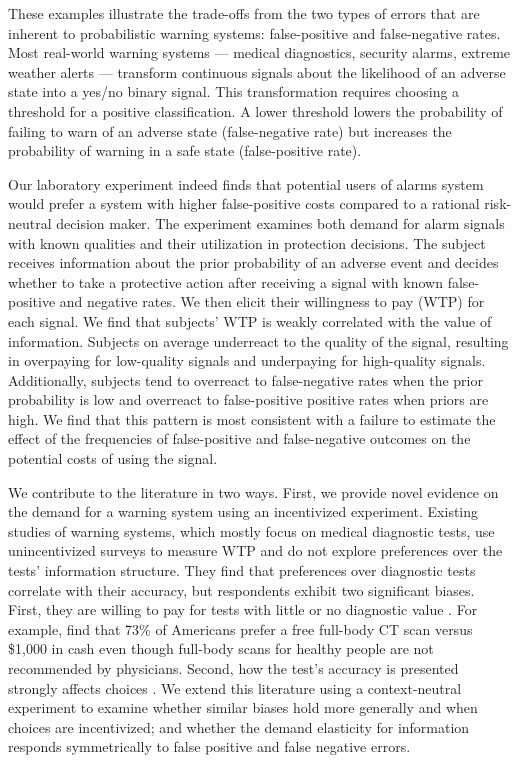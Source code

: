 \documentclass[12pt,a4paper]{article}
\begin{document}
These examples illustrate the trade-offs from the two types of errors that are inherent to probabilistic warning systems: false-positive and false-negative rates.  Most real-world warning systems --- medical diagnostics, security alarms, extreme weather alerts --- transform continuous signals about the likelihood of an adverse state into a yes/no binary signal. This transformation requires choosing a threshold for a positive classification. A lower threshold lowers the probability of failing to warn of an adverse state (false-negative rate) but increases the probability of warning in a safe state (false-positive rate). 

Our laboratory experiment indeed finds that potential users of alarms system would prefer a system with higher false-positive costs compared to a rational risk-neutral decision maker. The experiment examines both demand for alarm signals with known qualities and their utilization in protection decisions. The subject receives information about the prior probability of an adverse event and decides whether to take a protective action after receiving a signal with known false-positive and negative rates. We then elicit their willingness to pay (WTP) for each signal. We find that subjects' WTP is weakly correlated with the value of information. Subjects on average underreact to the quality of the signal, resulting in overpaying for low-quality signals and underpaying for high-quality signals. Additionally, subjects tend to overreact to false-negative rates when the prior probability is low and overreact to false-positive positive rates when priors are high. We find that this pattern is most consistent with a failure to estimate the effect of the frequencies of false-positive and false-negative outcomes on the potential costs of using the signal. 

We contribute to the literature in two ways. First, we provide novel evidence on the demand for a warning system using an incentivized experiment. Existing studies of warning systems, which mostly focus on medical diagnostic tests, use unincentivized surveys to measure WTP and do not explore preferences over the tests' information structure. They find that preferences over diagnostic tests correlate with their accuracy, but respondents exhibit two significant biases. First, they are willing to pay for tests with little or no diagnostic value \citep{schwartz_enthusiasm_2004, neumann_willingness--pay_2012}. For example, \citet{schwartz_enthusiasm_2004} find that 73\% of Americans prefer a free full-body CT scan versus \$1,000 in cash even though full-body scans for healthy people are not recommended by physicians. Second, how the test's accuracy is presented strongly affects choices \citep{howard_does_2009}. We extend this literature using a context-neutral experiment to examine whether similar biases hold more generally and when choices are incentivized; and whether the demand elasticity for information responds symmetrically to false positive and false negative errors. 
\end{document}
